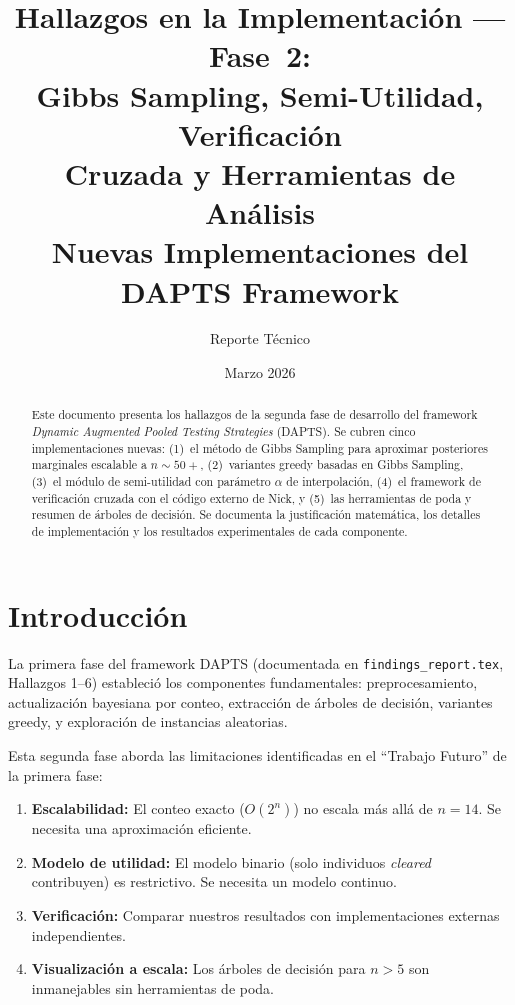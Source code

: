 \documentclass[11pt, a4paper]{article}
\title{Hallazgos en la Implementaci\'on --- Fase~2:\\
\textbf{Gibbs Sampling, Semi-Utilidad, Verificaci\'on\\Cruzada y Herramientas de An\'alisis}\\[0.5em]
\large Nuevas Implementaciones del DAPTS Framework}
\author{Reporte T\'ecnico}
\date{Marzo 2026}
\begin{document}
\maketitle

\begin{abstract}
Este documento presenta los hallazgos de la segunda fase de desarrollo del
framework \textit{Dynamic Augmented Pooled Testing Strategies} (DAPTS).
Se cubren cinco implementaciones nuevas: (1)~el m\'etodo de Gibbs Sampling
para aproximar posteriores marginales escalable a $n \sim 50+$,
(2)~variantes greedy basadas en Gibbs Sampling, (3)~el m\'odulo de
semi-utilidad con par\'ametro $\alpha$ de interpolaci\'on, (4)~el framework
de verificaci\'on cruzada con el c\'odigo externo de Nick, y (5)~las
herramientas de poda y resumen de \'arboles de decisi\'on. Se documenta
la justificaci\'on matem\'atica, los detalles de implementaci\'on y los
resultados experimentales de cada componente.
\end{abstract}

\tableofcontents
\newpage

\section{Introducci\'on}

La primera fase del framework DAPTS (documentada en
\texttt{findings\_report.tex}, Hallazgos 1--6) estableci\'o los
componentes fundamentales: preprocesamiento, actualizaci\'on bayesiana
por conteo, extracci\'on de \'arboles de decisi\'on, variantes greedy, y
exploraci\'on de instancias aleatorias.

Esta segunda fase aborda las limitaciones identificadas en el ``Trabajo
Futuro'' de la primera fase:
\begin{enumerate}[nosep]
    \item \textbf{Escalabilidad:} El conteo exacto ($O(2^n)$) no escala
    m\'as all\'a de $n = 14$. Se necesita una aproximaci\'on eficiente.
    \item \textbf{Modelo de utilidad:} El modelo binario (solo individuos
    \textit{cleared} contribuyen) es restrictivo. Se necesita un modelo
    continuo.
    \item \textbf{Verificaci\'on:} Comparar nuestros resultados con
    implementaciones externas independientes.
    \item \textbf{Visualizaci\'on a escala:} Los \'arboles de decisi\'on
    para $n > 5$ son inmanejables sin herramientas de poda.
\end{enumerate}
\end{document}
